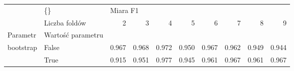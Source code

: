 \begin{tabular}{llrrrrrrrr}
\hline
          & \{\} & \multicolumn{8}{l}{Miara F1} \\
          & Liczba foldów &        2 &      3 &      4 &      5 &      6 &      7 &      8 &      9 \\
Parametr & Wartość parametru &          &        &        &        &        &        &        &        \\
\hline
bootstrap & False &    0.967 &  0.968 &  0.972 &  0.950 &  0.967 &  0.962 &  0.949 &  0.944 \\
          & True &    0.915 &  0.951 &  0.977 &  0.945 &  0.961 &  0.967 &  0.961 &  0.967 \\
\hline
\end{tabular}
